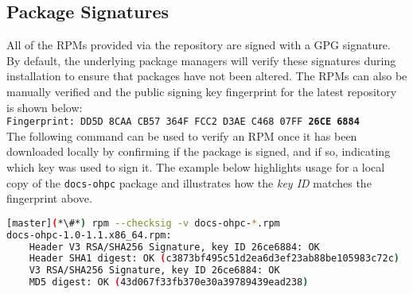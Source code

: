 \clearpage
\subsection{Package Signatures}

All of the RPMs provided via the \OHPC{} repository are signed with a GPG
signature. By default, the underlying package managers will verify these signatures during
installation to ensure that packages have not been altered. The RPMs can also
be manually verified and the public signing key fingerprint for the latest
repository is shown below: \\

\texttt{Fingerprint: DD5D 8CAA CB57 364F FCC2  D3AE C468 07FF {\bf26CE 6884}} \\

\noindent The following command can be used to verify an RPM once it
has been downloaded locally by confirming if the package is signed, and if so,
indicating which key was used to sign it.  The example below highlights usage
for a local copy of the \texttt{docs-ohpc} package and illustrates how the {\em
key ID} matches the fingerprint above.

\begin{lstlisting}[language=bash,keywords={}]
[master](*\#*) rpm --checksig -v docs-ohpc-*.rpm
docs-ohpc-1.0-1.1.x86_64.rpm:
    Header V3 RSA/SHA256 Signature, key ID 26ce6884: OK
    Header SHA1 digest: OK (c3873bf495c51d2ea6d3ef23ab88be105983c72c)
    V3 RSA/SHA256 Signature, key ID 26ce6884: OK
    MD5 digest: OK (43d067f33fb370e30a39789439ead238)
\end{lstlisting}



